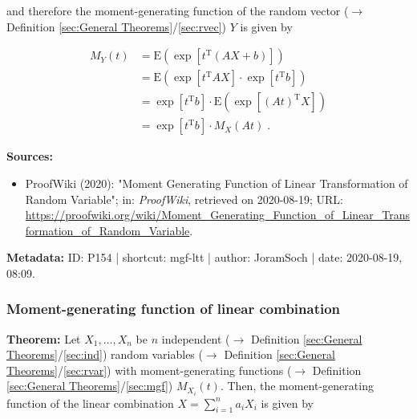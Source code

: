 \documentclass[a4paper,12pt,twoside]{book}
\begin{document}
and therefore the moment-generating function of the random vector ($\rightarrow$ Definition \ref{sec:General Theorems}/\ref{sec:rvec}) $Y$ is given by

\begin{equation} \label{eq:mgf-ltt-mgf-ltt-qed}
\begin{split}
M_Y(t) &= \mathrm{E} \left( \exp \left[ t^\mathrm{T} (AX + b) \right] \right) \\
&= \mathrm{E} \left( \exp \left[ t^\mathrm{T} A X \right] \cdot \exp \left[ t^\mathrm{T} b \right] \right) \\
&= \exp \left[ t^\mathrm{T} b \right] \cdot \mathrm{E} \left( \exp \left[ (A t)^\mathrm{T} X \right] \right) \\
&= \exp \left[ t^\mathrm{T} b \right] \cdot M_X(At) \; .
\end{split}
\end{equation}


\vspace{1em}
\textbf{Sources:}
\begin{itemize}
\item ProofWiki (2020): "Moment Generating Function of Linear Transformation of Random Variable"; in: \textit{ProofWiki}, retrieved on 2020-08-19; URL: \url{https://proofwiki.org/wiki/Moment_Generating_Function_of_Linear_Transformation_of_Random_Variable}.
\end{itemize}


\vspace{1em}
\textbf{Metadata:} ID: P154 | shortcut: mgf-ltt | author: JoramSoch | date: 2020-08-19, 08:09.
\vspace{1em}



\subsubsection[\textbf{Moment-generating function of linear combination}]{Moment-generating function of linear combination} \label{sec:mgf-lincomb}
\setcounter{equation}{0}

\textbf{Theorem:} Let $X_1, \ldots, X_n$ be $n$ independent ($\rightarrow$ Definition \ref{sec:General Theorems}/\ref{sec:ind}) random variables ($\rightarrow$ Definition \ref{sec:General Theorems}/\ref{sec:rvar}) with moment-generating functions ($\rightarrow$ Definition \ref{sec:General Theorems}/\ref{sec:mgf}) $M_{X_i}(t)$. Then, the moment-generating function of the linear combination $X = \sum_{i=1}^{n} a_i X_i$ is given by
\end{document}
